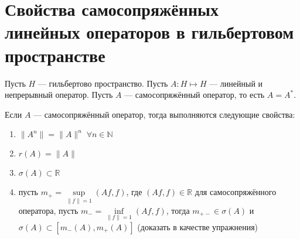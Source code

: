 \documentclass[14pt]{extarticle}
\begin{document}
\section*{Свойства самосопряжённых линейных операторов в гильбертовом 
пространстве}
Пусть $H$ --- гильбертово пространство.
Пусть $A : H \mapsto H$ --- линейный и непрерывный оператор.
Пусть $A$ --- самосопряжённый оператор, то есть $A = A^*$.
\begin{Utv}
    Если $A$ --- самосопряжённый оператор, тогда выполняются следующие
    свойства:
    \begin{enumerate}
        \item{$\|A^n\| = \|A\|^n\; \forall n \in \mathbb N$}
        \item{$r(A) = \|A\|$}
        \item{$\sigma(A) \subset \mathbb R$}
        \item{пусть $m_+ = \sup \limits_{\|f\| = 1} (Af, f)$, где $(Af, f) \in 
                \mathbb R$ для самосопряжённого оператора, пусть $m_- = \inf 
                \limits_{\|f\| = 1} (Af, f)$, тогда $m_{+-} \in \sigma(A)$ и
                $\sigma(A) \subset [m_-(A), m_+(A)]$ (доказать в качестве
            упражнения)}
    \end{enumerate}
\end{Utv}
\end{document}
